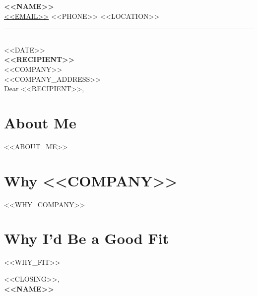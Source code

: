 \documentclass[11pt,letterpaper]{article}
\newcommand{\headerblock}[4]{%
  \begin{flushleft}
    {\fontsize{24pt}{28pt}\selectfont\color{dark}\textbf{#1}}\\[1pt]
    {\color{muted}\small #2 \quad\textbar\quad #3 \quad\textbar\quad #4}\\[2pt]
  \end{flushleft}
  {\color{accent}\rule{\linewidth}{1pt}}\\[4pt]
}
\begin{document}
\headerblock{<<NAME>>}{\href{mailto:<<EMAIL>>}{<<EMAIL>>}}{<<PHONE>>}{<<LOCATION>>}

{\color{muted}<<DATE>>}\\[6pt]
\textbf{<<RECIPIENT>>}\\
<<COMPANY>>\\
<<COMPANY_ADDRESS>>\\[8pt]

\noindent Dear <<RECIPIENT>>,

\section*{About Me}
<<ABOUT_ME>>

\section*{Why <<COMPANY>>}
<<WHY_COMPANY>>

\section*{Why I'd Be a Good Fit}
<<WHY_FIT>>

\vspace{8pt}
\noindent <<CLOSING>>,\\[14pt]
\textbf{<<NAME>>}
\end{document}
